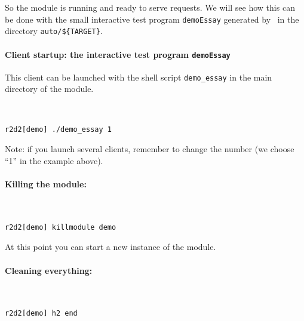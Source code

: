 So the module is running and ready to serve requests. We will see how
this can be done with the small interactive test program {\tt demoEssay}
generated by \GenoM\ in the directory {\tt auto/\$\{TARGET\}}.

\paragraph{Client startup: the interactive test program {\tt demoEssay}}

This client can be launched with the shell script {\tt demo\_essay} in the
main directory of the module.

\begin{description} %
\item ~
\begin{center}\begin{cartouche}\small\begin{verbatim}
r2d2[demo] ./demo_essay 1
\end{verbatim}\end{cartouche}\end{center}
\end{description}

Note: if  you launch several clients, remember  to  change the number (we
choose ``1'' in the example above).

\paragraph{Killing the module:}

\begin{description} %
\item ~
\begin{center}\begin{cartouche}\small\begin{verbatim}
r2d2[demo] killmodule demo
\end{verbatim}\end{cartouche}\end{center}
\end{description}

At this point you can start a new instance of the module.

\paragraph{Cleaning everything:}

\begin{description} %
\item ~
\begin{center}\begin{cartouche}\small\begin{verbatim}
r2d2[demo] h2 end
\end{verbatim}\end{cartouche}\end{center}
\end{description}


